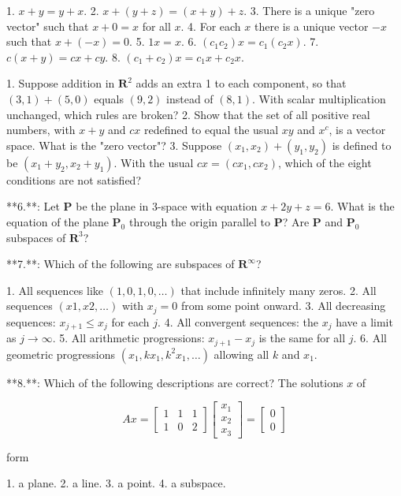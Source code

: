 1. \(x+y=y+x\).
2. \(x+(y+z)=(x+y)+z\).
3. There is a unique "zero vector" such that \(x+0=x\) for all \(x\).
4. For each \(x\) there is a unique vector \(-x\) such that \(x+(-x)=0\).
5. \(1x=x\).
6. \((c_{1}c_{2})x=c_{1}(c_{2}x)\).
7. \(c(x+y)=cx+cy\).
8. \((c_{1}+c_{2})x=c_{1}x+c_{2}x\).

1. Suppose addition in \(\mathbf{R}^{2}\) adds an extra 1 to each component, so that \((3,1)+(5,0)\) equals \((9,2)\) instead of \((8,1)\). With scalar multiplication unchanged, which rules are broken?
2. Show that the set of all positive real numbers, with \(x+y\) and \(cx\) redefined to equal the usual \(xy\) and \(x^{c}\), is a vector space. What is the "zero vector"?
3. Suppose \((x_{1},x_{2})+(y_{1},y_{2})\) is defined to be \((x_{1}+y_{2},x_{2}+y_{1})\). With the usual \(cx=(cx_{1},cx_{2})\), which of the eight conditions are not satisfied?

**6.**: Let \(\mathbf{P}\) be the plane in 3-space with equation \(x+2y+z=6\). What is the equation of the plane \(\mathbf{P}_{0}\) through the origin parallel to \(\mathbf{P}\)? Are \(\mathbf{P}\) and \(\mathbf{P}_{0}\) subspaces of \(\mathbf{R}^{3}\)?

**7.**: Which of the following are subspaces of \(\mathbf{R}^{\infty}\)?

1. All sequences like \((1,0,1,0,\ldots)\) that include infinitely many zeros.
2. All sequences \((x1,x2,\ldots)\) with \(x_{j}=0\) from some point onward.
3. All decreasing sequences: \(x_{j+1}\leq x_{j}\) for each \(j\).
4. All convergent sequences: the \(x_{j}\) have a limit as \(j\to\infty\).
5. All arithmetic progressions: \(x_{j+1}-x_{j}\) is the same for all \(j\).
6. All geometric progressions \((x_{1},kx_{1},k^{2}x_{1},\ldots)\) allowing all \(k\) and \(x_{1}\).

**8.**: Which of the following descriptions are correct? The solutions \(x\) of

\[Ax=\begin{bmatrix}1&1&1\\ 1&0&2\end{bmatrix}\begin{bmatrix}x_{1}\\ x_{2}\\ x_{3}\end{bmatrix}=\begin{bmatrix}0\\ 0\end{bmatrix}\]

form

1. a plane.
2. a line.
3. a point.
4. a subspace.

 